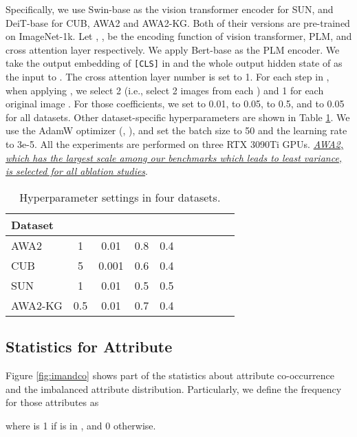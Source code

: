 \documentclass[letterpaper]{article} \usepackage{aaai23}  \usepackage{times}  \usepackage{helvet}  \usepackage{courier}  \usepackage[hyphens]{url}  \usepackage{graphicx} \urlstyle{rm} \def\UrlFont{\rm}  \usepackage{natbib}  \usepackage{caption} \frenchspacing  \setlength{\pdfpagewidth}{8.5in}  \setlength{\pdfpageheight}{11in}  \usepackage{algorithm}
\newcommand{\hyf}[1]{{\color{black}#1}}
\begin{document}
Specifically,
we use Swin-base \cite{DBLP:conf/iccv/LiuL00W0LG21} as the vision transformer encoder for SUN, and DeiT-base \cite{DBLP:conf/icml/TouvronCDMSJ21} for CUB, AWA2 and AWA2-KG.
Both of their versions are pre-trained on ImageNet-1k.
Let , ,  be the encoding function of vision transformer, PLM, and cross attention layer respectively. 
We apply Bert-base \cite{DBLP:conf/naacl/DevlinCLT19} as the PLM encoder.
We take the output embedding of {\tt [CLS]} in  and the whole output hidden state of  as the input to .
{The cross attention layer number}  is set to 1. 
For each step in , when applying , we select 2  (i.e., select 2 images from each ) and 1  
for {each}
original image .
For those coefficients, we set  to \hyf{0.01}, 
 to \hyf{0.05},  to \hyf{0.5},  and  to \hyf{0.05} for all datasets. Other dataset-specific hyperparameter{s} are shown in Table \ref{tab:hypdetail}.
We use {the} AdamW optimizer (, ), and set the batch size to 50 {and the learning rate to 3e-5.} 
All the experiments are performed on three RTX 3090Ti GPUs.
\ul{\emph{AWA2, which has the largest scale among our benchmarks which leads to least variance, is selected for all ablation studies}}.
\begin{table}[htbp]
		\centering  
 		\small
		\caption{Hyperparameter settings in four datasets.
		}
		\vspace{-5pt}
		\begin{tabular}{lccccccccc}
        \toprule
        Dataset  &  &  &  &  \\
\midrule
        AWA2  & 1   & 0.01   & 0.8   & 0.4    \\
        CUB   & 5   & 0.001   & 0.6   & 0.4    \\
        SUN   & 1   & 0.01   & 0.5   & 0.5    \\
        AWA2-KG & 0.5   & 0.01   & 0.7   & 0.4   \\
\bottomrule
		\end{tabular} 
\label{tab:hypdetail}
		\vspace{-7pt}
\end{table}

\subsection{Statistics for Attribute}
Figure \ref{fig:imandco} shows part of the statistics 
{about} attribute co-occurrence and {the} imbalanced attribute  distribution.
Particularly, 
we define the frequency  for those attributes as 

where  is 1 if  is in , and 0 otherwise.
\end{document}
